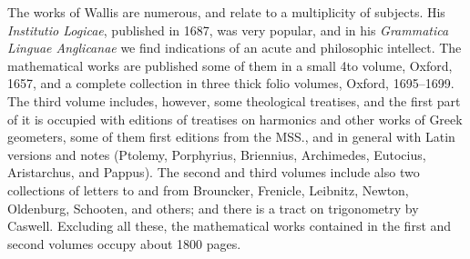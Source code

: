 \documentclass[11pt,a4paper]{book}
\begin{document}
The works of Wallis are numerous, and relate to a multiplicity of subjects. His \textit{Institutio Logicae}, published in 1687, was very popular, and in his \textit{Grammatica Linguae Anglicanae} we find indications of an acute and philosophic intellect. The mathematical works are published some of them in a small 4to volume, Oxford, 1657, and a complete collection in three thick folio volumes, Oxford, 1695--1699. The third volume includes, however, some theological treatises, and the first part of it is occupied with editions of treatises on harmonics and other works of Greek geometers, some of them first editions from the MSS., and in general with Latin versions and notes (Ptolemy, Porphyrius, Briennius, Archimedes, Eutocius, Aristarchus, and Pappus). The second and third volumes include also two collections of letters to and from Brouncker, Frenicle, Leibnitz, Newton, Oldenburg, Schooten, and others; and there is a tract on trigonometry by Caswell. Excluding all these, the mathematical works contained in the first and second volumes occupy about 1800 pages.
\end{document}
